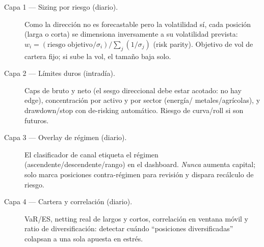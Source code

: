 \documentclass[11pt]{article}
\begin{document}
\begin{center}
\end{center}

\begin{description}
\item[Capa 1 --- Sizing por riesgo (diario).] Como la direcci\'on no es forecastable pero
la volatilidad s\'i, cada posici\'on (larga o corta) se dimensiona inversamente a su
volatilidad prevista: $w_i = (\text{riesgo objetivo}/\sigma_i)/\sum_j (1/\sigma_j)$
(risk parity). Objetivo de vol de cartera fijo; si sube la vol, el tama\~no baja solo.
\item[Capa 2 --- L\'imites duros (intrad\'ia).] Caps de bruto y neto (el sesgo direccional
debe estar acotado: no hay edge), concentraci\'on por activo y por sector (energ\'ia/
metales/agr\'icolas), y drawdown/stop con de-risking autom\'atico. Riesgo de curva/roll
si son futuros.
\item[Capa 3 --- Overlay de r\'egimen (diario).] El clasificador de canal etiqueta el
r\'egimen (ascendente/descendente/rango) en el dashboard. \emph{Nunca} aumenta capital;
solo marca posiciones contra-r\'egimen para revisi\'on y dispara rec\'alculo de riesgo.
\item[Capa 4 --- Cartera y correlaci\'on (diario).] VaR/ES, netting real de largos y cortos,
correlaci\'on en ventana m\'ovil y ratio de diversificaci\'on: detectar cu\'ando ``posiciones
diversificadas'' colapsan a una sola apuesta en estr\'es.
\end{description}
\end{document}
